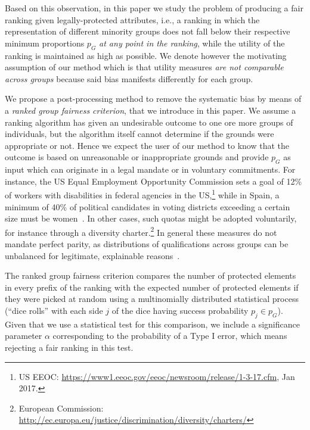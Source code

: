 Based on this observation, in this paper we study the problem of producing a fair ranking given legally-protected attributes, i.e., a ranking in which the representation of different minority groups does not fall below their respective minimum proportions $p_G$ \emph{at any point in the ranking}, while the utility of the ranking is maintained as high as possible.
%
We denote however the motivating assumption of our method which is that utility measures \emph{are not comparable across groups} because said bias manifests differently for each group.

We propose a post-processing method to remove the systematic bias by means of a \emph{ranked group fairness criterion}, that we introduce in this paper. 
%
We assume a ranking algorithm has given an undesirable outcome to one ore more groups of individuals, but the algorithm itself cannot determine if the grounds were appropriate or not. 
%
Hence we expect the user of our method to know that the outcome is based on unreasonable or inappropriate grounds and provide $p_G$ as input which can originate in a legal mandate or in voluntary commitments.
%
For instance, the US Equal Employment Opportunity Commission sets a goal of 12\% of workers with disabilities in federal agencies in the US,\footnote{US EEOC: \url{https://www1.eeoc.gov/eeoc/newsroom/release/1-3-17.cfm}, Jan 2017.}
%
while in Spain, a minimum of 40\% of political candidates in voting districts exceeding a certain size must be women~\cite{verge2010gendering}.
%
In other cases, such quotas might be adopted voluntarily, for instance through a diversity charter.\footnote{European Commission: \url{http://ec.europa.eu/justice/discrimination/diversity/charters/}}
%
In general these measures do not mandate perfect parity, as distributions of qualifications across groups can be unbalanced for legitimate, explainable reasons~\cite{zliobaite2011handling,pedreschi2009integrating}. %


The ranked group fairness criterion compares the number of protected elements in every prefix of the ranking with the expected number of protected elements if they were picked at random using a multinomially distributed statistical process (``dice rolls'' with each side $ j $ of the dice having success probability $p_j \in p_G$).
%
Given that we use a statistical test for this comparison, we include a significance parameter $\alpha$ corresponding to the probability of a Type I error, which means rejecting a fair ranking in this test.

